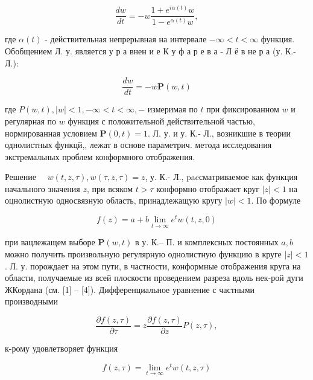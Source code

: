 \documentclass[10pt]{article}
\begin{document}
\[

\frac{d w}{d t}=-w \frac{1+e^{i \alpha(t)} w}{1-e^{\alpha(t)} w},

\]



где $\alpha(t)$ - действительная непрерывная на интервале $-\infty<t<\infty$ функция. Обобщением Л. у. является у р а внен и е К у ф а р е в а - Л ё в не р а (у. К.- Л.):



\[

\frac{d w}{d t}=-w \boldsymbol{P}(w, t)

\]



где $P(w, t),|w|<1,-\infty<t<\infty,-$ измеримая по $t$ при фиксированном $w$ и регулярная по $w$ функция с положительной действительной частью, нормированная условием $\boldsymbol{P}(0, t)=1$. Л. у. и у. К.- Л., возникшие в теории однолистных функцй,, лежат в основе параметрич. метода исследования экстремальных проблем конформного отображения.



Решение $\quad w(t, z, \tau), w(\tau, z, \tau)=z$, у. К.- Л., pacсматриваемое как функция начального значения $z$, при всяком $t>\tau$ конформно отображает круг $|z|<1$ на оцнолистную односвязную область, принадлежащую кругу $|w|<1$. По формуле



\[

f(z)=a+b \lim _{t \rightarrow \infty} e^{t} w(t, z, 0)

\]



при вацлежащем выборе $\boldsymbol{P}(w, t)$ в у. К.-- П. и комплексных постоянных $a, b$ можно получить произвольную регулярную однолистную функцию в круге $|z|<1$. Л. у. порождает на этом пути, в частности, конформные отображения круга на области, получаемые из всей плоскости проведением разреза вдоль нек-рой дуги ЖКордана (см. [1] -- [4]). Дифференциальное уравнение с частными производными



\[

\frac{\partial f(z, \tau)}{\partial \tau}=z \frac{\partial f(z, \tau)}{\partial z} P(z, \tau),

\]



к-рому удовлетворяет функция



\[

f(z, \tau)=\lim _{t \rightarrow \infty} e^{t} w(t, z, \tau)

\]
\end{document}
